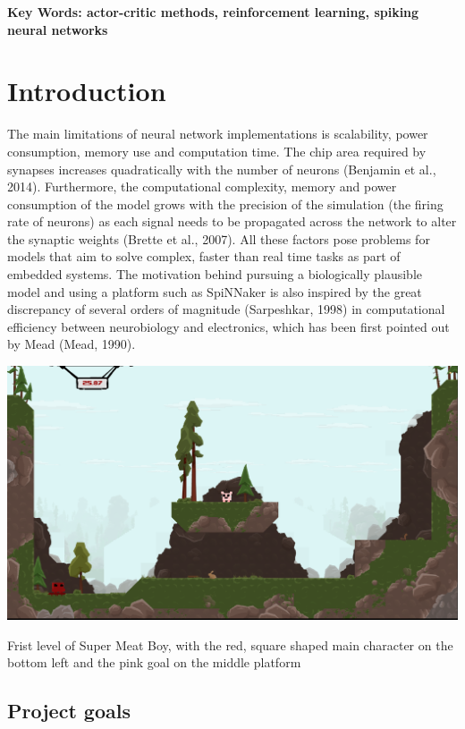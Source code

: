 \documentclass[10pt]{article}
\begin{document}
    \textbf{Key Words: actor-critic methods, reinforcement learning, spiking neural networks}


    \tableofcontents
    \section{Introduction}
    
    The main limitations of neural network implementations is scalability, power consumption, memory use and computation time. The chip area required by synapses increases quadratically with the number of neurons (Benjamin et al., 2014). Furthermore, the computational complexity, memory and power consumption of the model grows with the precision of the simulation (the firing rate of neurons) as each signal needs to be propagated across the network to alter the synaptic weights (Brette et al., 2007). All these factors pose problems for models that aim to solve complex, faster than real time tasks as part of embedded systems. The motivation behind pursuing a biologically plausible model and using a platform such as SpiNNaker is also inspired by the great discrepancy of several orders of magnitude (Sarpeshkar, 1998) in computational efficiency between neurobiology and electronics, which has been first pointed out by Mead (Mead, 1990).

    \begin{suppfigure*}[b]
    \center
    \includegraphics[width=165mm]{./level1.png}
    \caption{Frist level of Super Meat Boy, with the red, square shaped main character on the bottom left and the pink goal on the middle platform}
    \label{fig:firstLevel}
    \end{suppfigure*}

    \subsection{Project goals}
\end{document}
